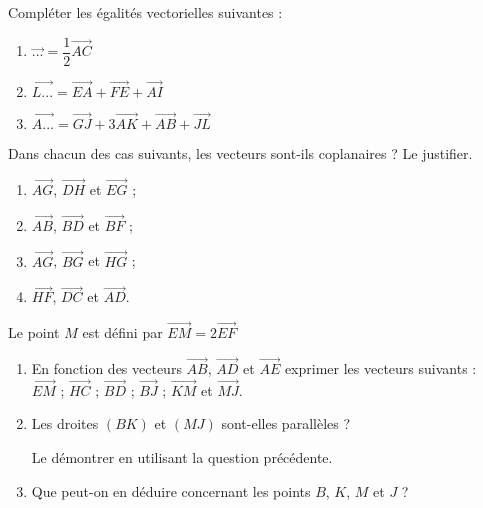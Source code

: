 \documentclass{cornouaille}
\begin{document}
\begin{exercice}
  Compléter les égalités vectorielles suivantes :
  \begin{enumerate}
  \item $\overrightarrow{...}=\dfrac{1}{2}\overrightarrow{AC}$
  \item
    $\overrightarrow{L...}=\overrightarrow{EA}+\overrightarrow{FE}+\overrightarrow{AI}$
  \item
    $\overrightarrow{A...}=\overrightarrow{GJ}+3\overrightarrow{AK}+\overrightarrow{AB}+\overrightarrow{JL}$
  \end{enumerate}
\end{exercice}



\begin{exercice}
  Dans chacun des cas suivants, les vecteurs sont-ils coplanaires ? Le
  justifier.
  \begin{enumerate}
  \item $\overrightarrow{AG}$, $\overrightarrow{DH}$ et
    $\overrightarrow{EG}$ ;
  \item $\overrightarrow{AB}$, $\overrightarrow{BD}$ et
    $\overrightarrow{BF}$ ;
  \item $\overrightarrow{AG}$, $\overrightarrow{BG}$ et
    $\overrightarrow{HG}$ ;
  \item $\overrightarrow{HF}$, $\overrightarrow{DC}$ et
    $\overrightarrow{AD}$.
  \end{enumerate}
\end{exercice}

\begin{exercice}
  Le point $M$ est défini par
  $\overrightarrow{EM}=2\overrightarrow{EF}$
  \begin{enumerate}
  \item En fonction des vecteurs
    $\overrightarrow{AB}$, $\overrightarrow{AD}$ et
    $\overrightarrow{AE}$ exprimer les vecteurs suivants :
    \\$\overrightarrow{EM}$
    ; $\overrightarrow{HC}$
    ; $\overrightarrow{BD}$
    ; $\overrightarrow{BJ}$
    ; $\overrightarrow{KM}$ et $\overrightarrow{MJ}$.
  \item Les droites $(BK)$ et $(MJ)$ sont-elles parallèles ?

    Le démontrer en utilisant la question précédente.
  \item Que peut-on en déduire concernant les points $B$,
    $K$, $M$ et $J$ ?
  \end{enumerate}
\end{exercice}
\end{document}
